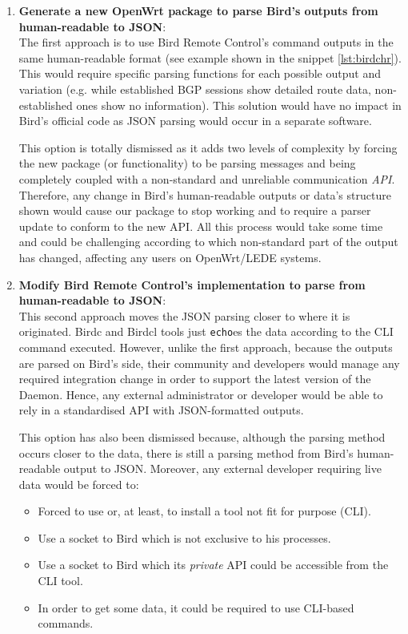 \begin{enumerate}
    \item \textbf{Generate a new OpenWrt package to parse Bird's outputs from human-readable to JSON}:\\
The first approach is to use Bird Remote Control's command outputs in the same human-readable format (see example shown in the snippet \ref{lst:birdchr}). This would require specific parsing functions for each possible output and variation (e.g. while established BGP sessions show detailed route data, non-established ones show no information). This solution would have no impact in Bird's official code as JSON parsing would occur in a separate software.
    
This option is totally dismissed as it adds two levels of complexity by forcing the new package (or functionality) to be parsing messages and being completely coupled with a non-standard and unreliable communication \textit{API}. Therefore, any change in Bird's human-readable outputs or data's structure shown would cause our package to stop working and to require a parser update to conform to the new API. All this process would take some time and could be challenging according to which non-standard part of the output has changed, affecting any users on OpenWrt/LEDE systems.


    \item \textbf{Modify Bird Remote Control's implementation to parse from human-readable to JSON}:\\
This second approach moves the JSON parsing closer to where it is originated. Birdc and Birdcl tools just \texttt{echo}es the data according to the CLI command executed. However, unlike the first approach, because the outputs are parsed on Bird's side, their community and developers would manage any required integration change in order to support the latest version of the Daemon. Hence, any external administrator or developer would be able to rely in a standardised API with JSON-formatted outputs.

This option has also been dismissed because, although the parsing method occurs closer to the data, there is still a parsing method from Bird's human-readable output to JSON. Moreover, any external developer requiring live data would be forced to:

\begin{itemize}
    \item Forced to use or, at least, to install a tool not fit for purpose (CLI).
    \item Use a socket to Bird which is not exclusive to his processes.
    \item Use a socket to Bird which its \textit{private} API could be accessible from the CLI tool.
    \item In order to get some data, it could be required to use CLI-based commands.
\end{itemize}


\end{enumerate}
